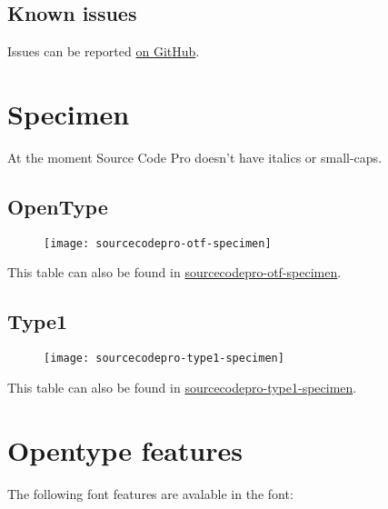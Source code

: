 \documentclass[10pt,a4paper,english]{article}
\newcommand*\file[1]{\href{run:#1.pdf}{#1}}
\begin{document}
\begin{multicols}{2}
\section{Known issues}
Issues can be reported \href{https://github.com/silkeh/latex-sourcecodepro/issues}{on GitHub}.


\newpage
\end{multicols}

\section{Specimen}
At the moment Source Code Pro doesn’t have italics or small-caps.
\label{sec:specimen}
\subsection{OpenType}
\begin{figure}[ht]
	\centering
	\texttt{[image: sourcecodepro-otf-specimen]}
\end{figure}
This table can also be found in \file{sourcecodepro-otf-specimen}.

\subsection{Type1}
\begin{figure}[ht]
	\centering
	\texttt{[image: sourcecodepro-type1-specimen]}
\end{figure}
This table can also be found in \file{sourcecodepro-type1-specimen}.

\newpage
\section{Opentype features}
\label{sec:otfinfo}

\newcommand*\textfeat[2]{{\sourcecodepro\addfontfeature{RawFeature=+#1}#2}}
The following font features are avalable in the font:
\end{document}

